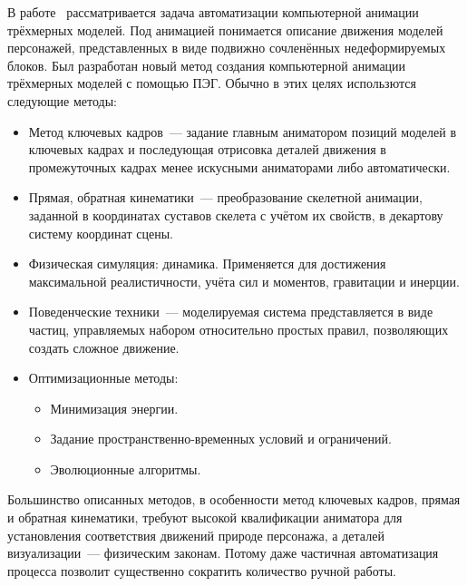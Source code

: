 В работе~\cite{Kwasnicka:2006:FIMCSIT} рассматривается задача автоматизации компьютерной анимации трёхмерных моделей. Под анимацией понимается описание движения моделей персонажей, представленных в виде подвижно сочленённых недеформируемых блоков. Был разработан новый метод создания компьютерной анимации трёхмерных моделей с помощью ПЭГ. Обычно в этих целях использются следующие методы:
\begin{itemize}
  \item Метод ключевых кадров~--- задание главным аниматором позиций моделей в ключевых кадрах и последующая отрисовка деталей движения в промежуточных кадрах менее искусными аниматорами либо автоматически.
  \item Прямая, обратная кинематики~--- преобразование скелетной анимации, заданной в координатах суставов скелета с учётом их свойств, в декартову систему координат сцены.
  \item Физическая симуляция: динамика. Применяется для достижения максимальной реалистичности, учёта сил и моментов, гравитации и инерции.
  \item Поведенческие техники~--- моделируемая система представляется в виде частиц, управляемых набором относительно простых правил, позволяющих создать сложное движение.
  \item Оптимизационные методы:
  \begin{itemize}
    \item Минимизация энергии.
    \item Задание пространственно-временных условий и ограничений.
    \item Эволюционные алгоритмы.
  \end{itemize}
\end{itemize}

Большинство описанных методов, в особенности метод ключевых кадров, прямая и обратная кинематики, требуют высокой квалификации аниматора для установления соответствия движений природе персонажа, а деталей визуализации~--- физическим законам. Потому даже частичная автоматизация процесса позволит существенно сократить количество ручной работы.

